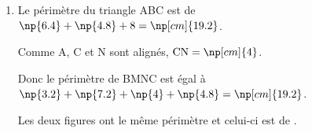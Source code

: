 \begin{enumerate}
	Les longueurs MN et AN sont respectivement  et .

	\item Le périmètre du triangle ABC est de {$\np{6.4}+\np{4.8}+8=\np[cm]{19.2}$}.

	Comme A, C et N sont alignés, {$\text{CN}=\np[cm]{4}$}.

	Donc le périmètre de BMNC est égal à {$\np{3.2}+\np{7.2}+\np{4}+\np{4.8}=\np[cm]{19.2}$}.

	Les deux figures ont le même périmètre et celui-ci est de .
\end{enumerate}

